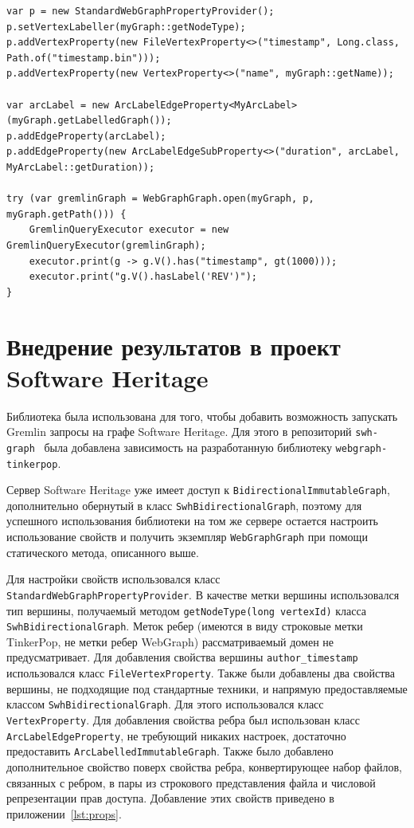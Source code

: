 \documentclass[times,specification,annotation]{itmo-student-thesis}
\begin{document}
\begin{lstlisting}[float=!h,caption={Пример использования библиотеки для регистрации свойств и исполнения Gremlin запросов},label={lst:webgraph-tinkerpop-example}]
var p = new StandardWebGraphPropertyProvider();
p.setVertexLabeller(myGraph::getNodeType);
p.addVertexProperty(new FileVertexProperty<>("timestamp", Long.class, Path.of("timestamp.bin")));
p.addVertexProperty(new VertexProperty<>("name", myGraph::getName));

var arcLabel = new ArcLabelEdgeProperty<MyArcLabel>(myGraph.getLabelledGraph());
p.addEdgeProperty(arcLabel);
p.addEdgeProperty(new ArcLabelEdgeSubProperty<>("duration", arcLabel, MyArcLabel::getDuration));

try (var gremlinGraph = WebGraphGraph.open(myGraph, p, myGraph.getPath())) {
    GremlinQueryExecutor executor = new GremlinQueryExecutor(gremlinGraph);
    executor.print(g -> g.V().has("timestamp", gt(1000)));
    executor.print("g.V().hasLabel('REV')");
}
\end{lstlisting}

\section{Внедрение результатов в проект Software Heritage}

Библиотека была использована для того, чтобы добавить возможность запускать Gremlin запросы на графе Software Heritage. Для этого в репозиторий \texttt{swh-graph}~\cite{swh-graph} была добавлена зависимость на разработанную библиотеку \texttt{webgraph-tinkerpop}.

Сервер Software Heritage уже имеет доступ к \texttt{BidirectionalImmutableGraph}, дополнительно обернутый в класс \texttt{SwhBidirectionalGraph}, поэтому для успешного использования библиотеки на том же сервере остается настроить использование свойств и получить экземпляр \texttt{WebGraphGraph} при помощи статического метода, описанного выше.

Для настройки свойств использовался класс \texttt{StandardWebGraphPropertyProvider}. В качестве метки вершины использовался тип вершины, получаемый методом \texttt{getNodeType(long vertexId)} класса \texttt{SwhBidirectionalGraph}. Меток ребер (имеются в виду строковые метки TinkerPop, не метки ребер WebGraph) рассматриваемый домен не предусматривает. Для добавления свойства вершины \texttt{author\_timestamp} использовался класс \texttt{FileVertexProperty}. Также были добавлены два свойства вершины, не подходящие под стандартные техники, и напрямую предоставляемые классом \texttt{SwhBidirectionalGraph}. Для этого использовался класс \texttt{VertexProperty}.
Для добавления свойства ребра был использован класс \texttt{ArcLabelEdgeProperty}, не требующий никаких настроек, достаточно предоставить \texttt{ArcLabelledImmutableGraph}. Также было добавлено дополнительное свойство поверх свойства ребра, конвертирующее набор файлов, связанных с ребром, в пары из строкового представления файла и числовой репрезентации прав доступа. Добавление этих свойств приведено в приложении~\ref{lst:props}.
\end{document}
